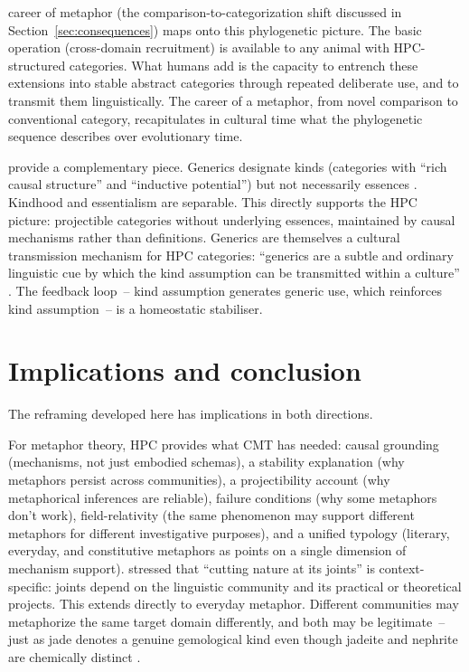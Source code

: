 \documentclass[12pt]{article}
\begin{document}
 career of metaphor (the comparison-to-categorization shift discussed in Section~\ref{sec:consequences}) maps onto this phylogenetic picture. The basic operation (cross-domain recruitment) is available to any animal with HPC-structured categories. What humans add is the capacity to entrench these extensions into stable abstract categories through repeated deliberate use, and to transmit them linguistically. The career of a metaphor, from novel comparison to conventional category, recapitulates in cultural time what the phylogenetic sequence describes over evolutionary time.

\textcite{noyes2019} provide a complementary piece. Generics designate kinds (categories with \enquote{rich causal structure} and \enquote{inductive potential}) but not necessarily essences \citep[2]{noyes2019}. Kindhood and essentialism are separable. This directly supports the HPC picture: projectible categories without underlying essences, maintained by causal mechanisms rather than definitions. Generics are themselves a cultural transmission mechanism for HPC categories: \enquote{generics are a subtle and ordinary linguistic cue by which the kind assumption can be transmitted within a culture} \citep[5]{noyes2019}. The feedback loop~-- kind assumption generates generic use, which reinforces kind assumption~-- is a homeostatic stabiliser.

\section{Implications and conclusion}
\label{sec:conclusion}

The reframing developed here has implications in both directions.

For metaphor theory, HPC provides what CMT has needed: causal grounding (mechanisms, not just embodied schemas), a stability explanation (why metaphors persist across communities), a projectibility account (why metaphorical inferences are reliable), failure conditions (why some metaphors don't work), field-relativity (the same phenomenon may support different metaphors for different investigative purposes), and a unified typology (literary, everyday, and constitutive metaphors as points on a single dimension of mechanism support). \textcite[532]{boyd1993metaphor} stressed that \enquote{cutting nature at its joints} is context-specific: joints depend on the linguistic community and its practical or theoretical projects. This extends directly to everyday metaphor. Different communities may metaphorize the same target domain differently, and both may be legitimate~-- just as jade denotes a genuine gemological kind even though jadeite and nephrite are chemically distinct \citep[396]{boyd1979}.
\end{document}

